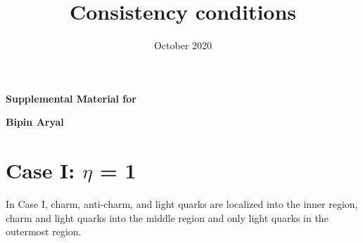 \documentclass[fleqn, 10pt]{article}
\title{Consistency conditions}
\date{October 2020}
\begin{document}
\clearpage
\pagebreak
\setcounter{page}{1}
\begin{center}
\noindent
   {\fontsize{18pt}{20.8pt}\selectfont	\textbf{{\noindent Supplemental Material for }}}
   \end{center}
   \begin{center}
       \textbf{Bipin Aryal}
   \end{center}

\section{Case I: $\eta$ = 1}
    In Case I, charm, anti-charm, and light quarks are localized into the inner region, charm and light quarks into the middle region and only light quarks in the outermost region. 
\end{document}
